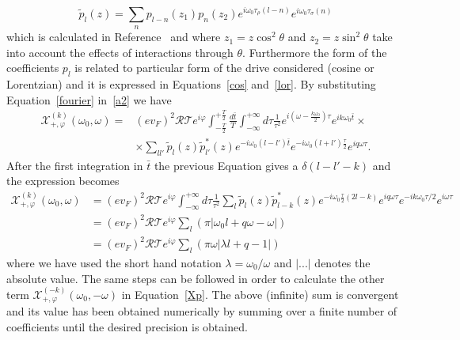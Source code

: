 \documentclass[12pt]{iopart}
\begin{document}
\begin{equation}
    \widetilde{p}_{l}(z)=\sum_{n}p_{l-n}(z_1)p_n(z_2)e^{i\omega_0\tau_\rho(l-n)}e^{i\omega_0 \tau_\sigma (n)}
\end{equation}
which is calculated in Reference~\cite{Rebora20} and where $z_1=z \cos^2\theta$ and $z_2=z \sin^2\theta$ take into account the effects of interactions through $\theta$. Furthermore the form of the coefficients $p_l$ is related to particular form of the drive considered (cosine or Lorentzian) and it is expressed in Equations~\eqref{cos} and~\eqref{lor}. By substituting Equation~\eqref{fourier} in~\eqref{a2} we have
\begin{equation}
    \begin{split}
        \mathcal{X}^{(k)}_{+,\varphi}(\omega_0,\omega)=&(ev_F)^2\mathcal{R}\mathcal{T}e^{i\varphi}\int_{-\frac{T}{2}}^{+\frac{T}{2}} \frac{d\bar{t}}{T}\int_{-\infty}^{+\infty} d\tau
\frac{1}{\tau^2} e^{i(\omega-\frac{k\omega_0}{2})\tau}e^{ik\omega_0 \bar{t}} \times \\
&\times \sum_{l l'} \widetilde{p}_{l}(z) \widetilde{p}^*_{l'}(z)e^{-i\omega_0(l-l')\bar{t}} e^{-i\omega_0(l+l')\frac{\tau}{2}}e^{i q\omega \tau}.
\end{split}
\end{equation}
After the first integration in $\bar{t}$ the previous Equation gives a $\delta(l-l'-k)$ and the expression becomes
\begin{equation}
    \begin{split}
        \mathcal{X}^{(k)}_{+,\varphi}(\omega_0,\omega)&=(ev_F)^2\mathcal{R}\mathcal{T}e^{i\varphi}\int_{-\infty}^{+\infty} d\tau \frac{1}{\tau^2}\sum_{l} \widetilde{p}_{l}(z) \widetilde{p}^*_{l-k}(z) e^{-i\omega_0\frac{\tau}{2}(2l-k)}e^{iq\omega \tau} e^{-i k\omega_0 \tau/2} e^{i\omega\tau}\\
        &=(ev_F)^2\mathcal{R}\mathcal{T}e^{i\varphi}\sum_l(\pi|\omega_0 l+q\omega-\omega|)\\
        &=(ev_F)^2\mathcal{R}\mathcal{T}e^{i\varphi}\sum_l(\pi\omega|\lambda l+q-1|)
        \end{split}
\end{equation}
where we have used the short hand notation $\lambda=\omega_0/\omega$ and $|...|$ denotes the absolute value. The same steps can be followed in order to calculate the other term $\mathcal{X}_{+,\varphi}^{(-k)}(\omega_0,-\omega)$ in Equation~\eqref{Xp}. The above (infinite) sum is convergent and its value has been obtained numerically by summing over a finite number of coefficients until the desired precision is obtained.
\end{document}
